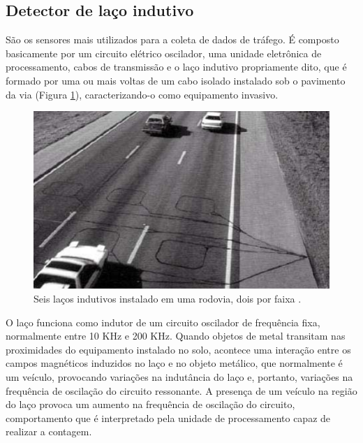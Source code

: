 
\subsection{Detector de laço indutivo} %
\label{sub:detectores_de_la_os_indutivos}

São os sensores mais utilizados para a coleta de dados de tráfego. É composto basicamente por um circuito elétrico oscilador, uma unidade eletrônica de processamento, cabos de transmissão e o laço indutivo propriamente dito, que é formado por uma ou mais voltas de um cabo isolado instalado sob o pavimento da via (Figura \ref{fig:laco_indutivo}), caracterizando-o como equipamento invasivo.

\begin{figure}[ht]
  \begin{center}
    \includegraphics[scale=0.6]{imgs/laco_indutivo.png}
  \end{center}
  \caption{Seis laços indutivos instalado em uma rodovia, dois por faixa \citep{goldner:2009:misc}.}
  \label{fig:laco_indutivo}
\end{figure}

O laço funciona como indutor de um circuito oscilador de frequência fixa, normalmente entre 10 KHz e 200 KHz. Quando objetos de metal transitam nas proximidades do equipamento instalado no solo, acontece uma interação entre os campos magnéticos induzidos no laço e no objeto metálico, que normalmente é um veículo, provocando variações na indutância do laço e, portanto, variações na frequência de oscilação do circuito ressonante. A presença de um veículo na região do laço provoca um aumento na frequência de oscilação do circuito, comportamento que é interpretado pela unidade de processamento capaz de realizar a contagem.

